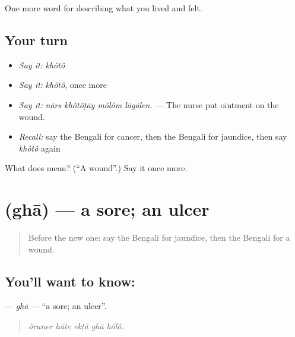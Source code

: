 \begin{grammarlens}[title={What you've built}]
One more word for describing what you lived and felt.
\end{grammarlens}

\subsection*{Your turn}
\begin{itemize}
\raggedright
  \item \emph{Say it:} \emph{khôtô}
  \item \emph{Say it:} \emph{khôtô}, once more
  \item \emph{Say it:} \emph{nārs khôtôṭāy môlôm lāgālen.} — The nurse put ointment on the wound.
  \item \emph{Recall:} say the Bengali for cancer, then the Bengali for jaundice, then say \emph{khôtô} again
\end{itemize}

\begin{tcolorbox}[breakable,colback=teal!4,colframe=teal!35!black,title={Before you move on}]
What does  mean? (\textquotedblleft{}A wound\textquotedblright{}.) Say it once more.
\end{tcolorbox}
\section[\texorpdfstring{\bn{ঘা} (ghā)}{ঘা (ghā)}]{ (ghā) — a sore; an ulcer}

\label{lesson:BN-C475-gha}



\begin{quote}
Before the new one: say the Bengali for jaundice, then the Bengali for a wound.
\end{quote}

\subsection*{You'll want to know: }
\textbf{} — \emph{ghā} — \textquotedblleft{}a sore; an ulcer\textquotedblright{}.

\begin{quote}
    
\end{quote}

\begin{quote}
\emph{ôruner hāte ekṭā ghā hôlô.}
\end{quote}

